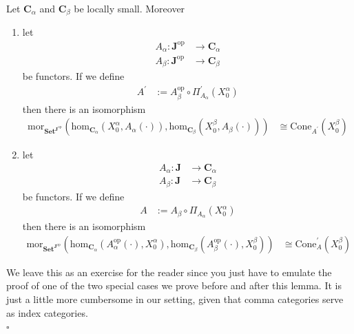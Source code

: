 \begin{lem}
\label{lem:genyonedaprobing}
Let $\mathbf{C}_{\alpha}$ and $\mathbf{C}_{\beta}$ be locally small.
Moreover
\begin{enumerate}
\item[(YP)]
let
\begin{align*}
  A_{\alpha}
  \colon
  \mathbf{J}^{\textrm{op}}
  &\rightarrow
  \mathbf{C}_{\alpha}
  \\
  A_{\beta}
  \colon
  \mathbf{J}^{\textrm{op}}
  &\rightarrow
  \mathbf{C}_{\beta}
\end{align*}
be functors.
If we define
\begin{align*}
  A^{\prime}
  &:=
  A_{\beta}^{\textrm{op}}
  \circ
  \Pi_{A_{\alpha}}^{\prime}(X_{0}^{\alpha})
\end{align*}
then there is an isomorphism
\begin{align*}
  \mathrm{mor}_{\mathbf{Set}^{\mathbf{J}^{\textrm{op}}}}
  \left(
    \mathrm{hom}_{\mathbf{C}_{\alpha}}
    \left(
      X_{0}^{\alpha},
      A_{\alpha}(\cdot)
    \right),
    \mathrm{hom}_{\mathbf{C}_{\beta}}
    \left(
      X_{0}^{\beta},
      A_{\beta}(\cdot)
    \right)
  \right)
  &\cong
  \mathrm{Cone}_{A^{\prime}}(X_{0}^{\beta})
\end{align*}
\item[(YP$_{\mathbf{C}_{\alpha},\mathbf{C}_{\beta}}^{\prime}$)]
let
\begin{align*}
  A_{\alpha}
  \colon
  \mathbf{J}
  &\rightarrow
  \mathbf{C}_{\alpha}
  \\
  A_{\beta}
  \colon
  \mathbf{J}
  &\rightarrow
  \mathbf{C}_{\beta}
\end{align*}
be functors.
If we define
\begin{align*}
  A
  &:=
  A_{\beta}
  \circ
  \Pi_{A_{\alpha}}(X_{0}^{\alpha})
\end{align*}
then there is an isomorphism
\begin{align*}
  \mathrm{mor}_{\mathbf{Set}^{\mathbf{J}^{\textrm{op}}}}
  \left(
    \mathrm{hom}_{\mathbf{C}_{\alpha}}
    \left(
      A_{\alpha}^{\textrm{op}}(\cdot),
      X_{0}^{\alpha}
    \right),
    \mathrm{hom}_{\mathbf{C}_{\beta}}
    \left(
      A_{\beta}^{\textrm{op}}(\cdot),
      X_{0}^{\beta}
    \right)
  \right)
  &\cong
  \mathrm{Cone}_{A}^{\prime}(X_{0}^{\beta})
\end{align*}
\end{enumerate}
\end{lem}
\begin{prf}
We leave this as an exercise for the reader since you just have to emulate the proof of one of the two special cases we prove before and after this lemma.
It is just a little more cumbersome in our setting, given that comma categories serve as index categories.
\\
\phantom{proven}
\hfill
$\square$
\end{prf}
